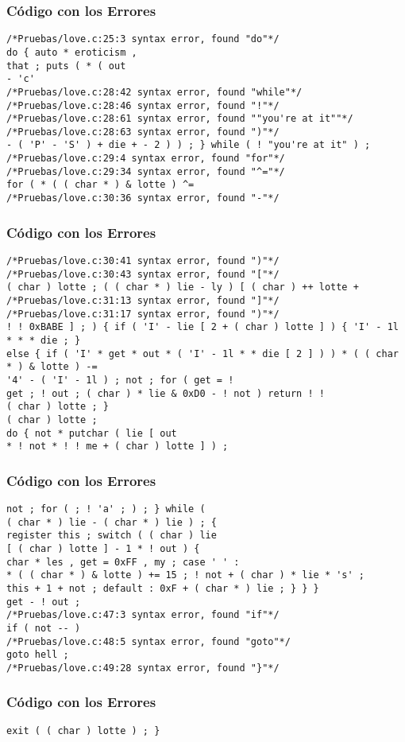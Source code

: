 \documentclass{beamer}
\begin{document}
\begin{frame}[fragile]
\frametitle{C\'odigo con los Errores}
\begin{lstlisting}[style=CStyle]
/*Pruebas/love.c:25:3 syntax error, found "do"*/
do { auto * eroticism , 
that ; puts ( * ( out 
- 'c' 
/*Pruebas/love.c:28:42 syntax error, found "while"*/
/*Pruebas/love.c:28:46 syntax error, found "!"*/
/*Pruebas/love.c:28:61 syntax error, found ""you're at it""*/
/*Pruebas/love.c:28:63 syntax error, found ")"*/
- ( 'P' - 'S' ) + die + - 2 ) ) ; } while ( ! "you're at it" ) ; 
/*Pruebas/love.c:29:4 syntax error, found "for"*/
/*Pruebas/love.c:29:34 syntax error, found "^="*/
for ( * ( ( char * ) & lotte ) ^= 
/*Pruebas/love.c:30:36 syntax error, found "-"*/
\end{lstlisting}
\end{frame}
\begin{frame}[fragile]
\frametitle{C\'odigo con los Errores}
\begin{lstlisting}[style=CStyle]
/*Pruebas/love.c:30:41 syntax error, found ")"*/
/*Pruebas/love.c:30:43 syntax error, found "["*/
( char ) lotte ; ( ( char * ) lie - ly ) [ ( char ) ++ lotte + 
/*Pruebas/love.c:31:13 syntax error, found "]"*/
/*Pruebas/love.c:31:17 syntax error, found ")"*/
! ! 0xBABE ] ; ) { if ( 'I' - lie [ 2 + ( char ) lotte ] ) { 'I' - 1l * * * die ; } 
else { if ( 'I' * get * out * ( 'I' - 1l * * die [ 2 ] ) ) * ( ( char * ) & lotte ) -= 
'4' - ( 'I' - 1l ) ; not ; for ( get = ! 
get ; ! out ; ( char ) * lie & 0xD0 - ! not ) return ! ! 
( char ) lotte ; } 
( char ) lotte ; 
do { not * putchar ( lie [ out 
* ! not * ! ! me + ( char ) lotte ] ) ; 
\end{lstlisting}
\end{frame}
\begin{frame}[fragile]
\frametitle{C\'odigo con los Errores}
\begin{lstlisting}[style=CStyle]
not ; for ( ; ! 'a' ; ) ; } while ( 
( char * ) lie - ( char * ) lie ) ; { 
register this ; switch ( ( char ) lie 
[ ( char ) lotte ] - 1 * ! out ) { 
char * les , get = 0xFF , my ; case ' ' : 
* ( ( char * ) & lotte ) += 15 ; ! not + ( char ) * lie * 's' ; 
this + 1 + not ; default : 0xF + ( char * ) lie ; } } } 
get - ! out ; 
/*Pruebas/love.c:47:3 syntax error, found "if"*/
if ( not -- ) 
/*Pruebas/love.c:48:5 syntax error, found "goto"*/
goto hell ; 
/*Pruebas/love.c:49:28 syntax error, found "}"*/
\end{lstlisting}
\end{frame}
\begin{frame}[fragile]
\frametitle{C\'odigo con los Errores}
\begin{lstlisting}[style=CStyle]
exit ( ( char ) lotte ) ; } \end{lstlisting}
\end{frame}
\end{document}
